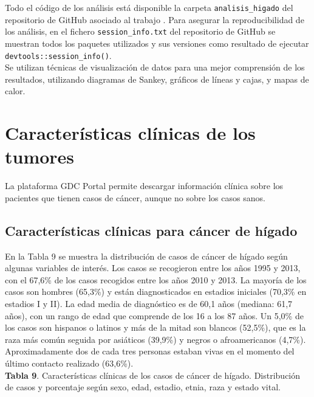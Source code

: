 Todo el código de los análisis está disponible la carpeta \texttt{analisis\_higado} del repositorio de GitHub asociado al trabajo \cite{Redondo-Sanchez2020}. Para asegurar la reproducibilidad de los análisis, en el fichero \texttt{session\_info.txt} del repositorio de GitHub \cite{Redondo-Sanchez2020} se muestran todos los paquetes utilizados y sus versiones como resultado de ejecutar \texttt{devtools::session\_info()}.\\

Se utilizan técnicas de visualización de datos para una mejor comprensión de los resultados, utilizando diagramas de Sankey, gráficos de líneas y cajas, y mapas de calor.\\

\section{Características clínicas de los tumores}
 
La plataforma GDC Portal \cite{GDCPortal} permite descargar información clínica sobre los pacientes que tienen casos de cáncer, aunque no sobre los casos sanos.

\subsection{Características clínicas para cáncer de hígado}

En la Tabla 9 se muestra  la distribución de casos de cáncer de hígado según algunas variables de interés. Los casos se recogieron entre los años 1995 y 2013, con el 67,6\% de los casos recogidos entre los años 2010 y 2013. La mayoría de los casos son hombres (65,3\%) y están diagnosticados en estadios iniciales (70,3\% en estadios I y II). La edad media de diagnóstico es de 60,1 años (mediana: 61,7 años), con un rango de edad que comprende de los 16 a los 87 años. Un 5,0\% de los casos son hispanos o latinos y más de la mitad son blancos (52,5\%), que es la raza más común seguida por asiáticos (39,9\%) y negros o afroamericanos (4,7\%). Aproximadamente dos de cada tres personas estaban vivas en el momento del último contacto realizado (63,6\%).\\

\newpage
\textbf{Tabla 9}. Características clínicas de los casos de cáncer de hígado. Distribución de casos y porcentaje según sexo, edad, estadio, etnia, raza y estado vital.

